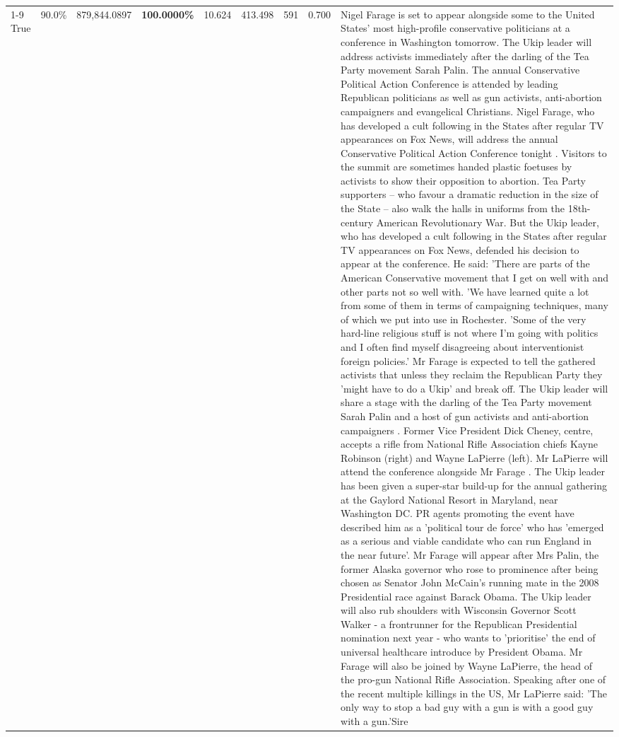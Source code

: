\begin{table}[H]
\begin{tabular}{lllrlllll}
\cline{1-9}
True & 90.0\% & 879,844.0897 & \bfseries \color{red} 100.0000\% & 10.624 & 413.498 & 591 & 0.700 & Nigel Farage is set to appear alongside some to the United States' most high-profile conservative politicians at a conference in Washington tomorrow. The Ukip leader will address activists immediately after the darling of the Tea Party movement Sarah Palin. The annual Conservative Political Action Conference is attended by leading Republican politicians as well as gun activists, anti-abortion campaigners and evangelical Christians. Nigel Farage, who has developed a cult following in the States after regular TV appearances on Fox News, will address the annual Conservative Political Action Conference tonight . Visitors to the summit are sometimes handed plastic foetuses by activists to show their opposition to abortion. Tea Party supporters – who favour a dramatic reduction in the size of the State – also walk the halls in uniforms from the 18th-century American Revolutionary War. But the Ukip leader, who has developed a cult following in the States after regular TV appearances on Fox News, defended his decision to appear at the conference. He said: 'There are parts of the American Conservative movement that I get on well with and other parts not so well with. 'We have learned quite a lot from some of them in terms of campaigning techniques, many of which we put into use in Rochester. 'Some of the very hard-line religious stuff is not where I'm going with politics and I often find myself disagreeing about interventionist foreign policies.' Mr Farage is expected to tell the gathered activists that unless they reclaim the Republican Party they 'might have to do a Ukip' and break off. The Ukip leader will share a stage with the darling of the Tea Party movement Sarah Palin and a host of gun activists and anti-abortion campaigners . Former Vice President Dick Cheney, centre, accepts a rifle from National Rifle Association chiefs Kayne Robinson (right) and Wayne LaPierre (left). Mr LaPierre will attend the conference alongside Mr Farage . The Ukip leader has been given a super-star build-up for the annual gathering at the Gaylord National Resort in Maryland, near Washington DC. PR agents promoting the event have described him as a 'political tour de force' who has 'emerged as a serious and viable candidate who can run England in the near future'. Mr Farage will appear after Mrs Palin, the former Alaska governor who rose to prominence after being chosen as Senator John McCain's running mate in the 2008 Presidential race against Barack Obama. The Ukip leader will also rub shoulders with Wisconsin Governor Scott Walker - a frontrunner for the Republican Presidential nomination next year - who wants to 'prioritise' the end of universal healthcare introduce by President Obama. Mr Farage will also be joined by Wayne LaPierre, the head of the pro-gun National Rifle Association. Speaking after one of the recent multiple killings in the US, Mr LaPierre said: 'The only way to stop a bad guy with a gun is with a good guy with a gun.'Sire \\

\end{tabular}
\end{table}
